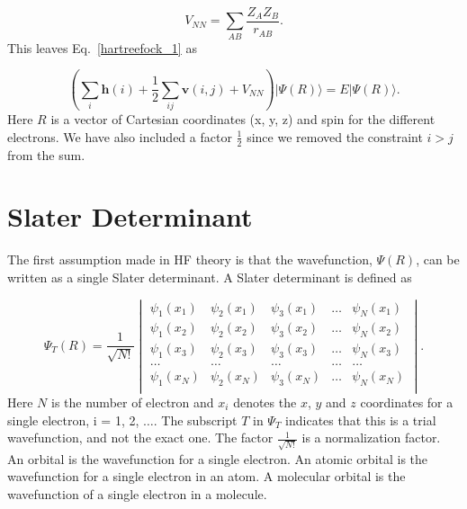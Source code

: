 \documentclass[a4paper,norsk,11pt,twoside]{report}
\begin{document}
\begin{equation}
V_{NN} = \sum_{AB} \frac{Z_A Z_B}{r_{AB}}.
\end{equation}
This leaves Eq.~\eqref{hartreefock_1} as

\begin{equation}
\left( 
\sum_i \textbf{h}(i) + \frac{1}{2} \sum_{ij} \textbf{v}(i,j) + V_{NN}
\right) | \Psi(R) \rangle
= E | \Psi(R) \rangle.
\end{equation}
Here $R$ is a vector of Cartesian coordinates (x, y, z) and spin for
the different electrons. We have also included a factor $\frac{1}{2}$
since we removed the constraint $i > j$ from the sum.

\section{Slater Determinant}
The first assumption made in HF theory is that the wavefunction, $\Psi(R)$,
can be written as a single Slater determinant. A Slater determinant is
defined as

\begin{equation}
\Psi_T(R) = \frac{1}{\sqrt{N!}}
\begin{vmatrix} 

        \psi_1(x_1) & \psi_2(x_1)  & \psi_3(x_1) & \dots  & \psi_N(x_1) \\ 
        \psi_1(x_2) & \psi_2(x_2)  & \psi_3(x_2) & \dots & \psi_N(x_2) \\
        \psi_1(x_3) & \psi_2(x_3)  & \psi_3(x_3) & \dots & \psi_N(x_3) \\
        \dots & \dots & \dots & \dots & \dots \\
        \psi_1(x_N) & \psi_2(x_N)  & \psi_3(x_N) & \dots & \psi_N(x_N) \\

    \end{vmatrix}
    .
\end{equation}
Here $N$ is the number of electron and $x_i$ denotes the $x$, $y$ and
$z$ coordinates for a single electron, i = 1, 2, $\dots$. The subscript $T$ in $\Psi_T$
indicates that this is a trial wavefunction, and not the exact
one. The factor $\frac{1}{\sqrt{N!}}$ is a normalization factor.  \\

An orbital is the wavefunction for a single electron. An atomic orbital is the wavefunction for a single electron in an atom. A molecular orbital is the wavefunction of a single electron in a molecule. \\
\end{document}
